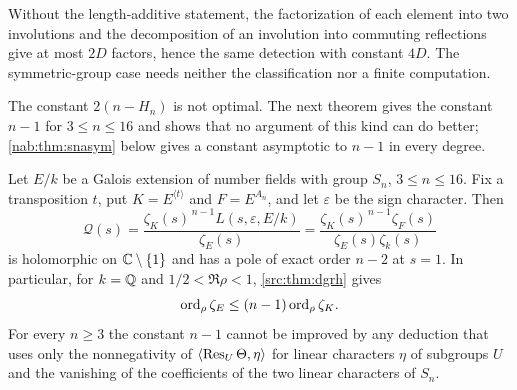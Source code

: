 Without the length-additive statement, the factorization of each element into two
involutions and the decomposition of an involution into commuting reflections give at most
$2D$ factors, hence the same detection with constant $4D$. The symmetric-group case needs
neither the classification nor a finite computation.

The constant $2(n-H_n)$ is not optimal. The next theorem gives the constant $n-1$ for
$3\le n\le16$ and shows that no argument of this kind can do better; \cref{nab:thm:snasym}
below gives a constant asymptotic to $n-1$ in every degree.

\begin{theorem}\label{nab:thm:snsharp}
Let $E/k$ be a Galois extension of number fields with group $S_n$, $3\le n\le16$. Fix a
transposition $t$, put $K=E^{\langle t\rangle}$ and $F=E^{A_n}$, and let $\varepsilon$ be
the sign character. Then
\[
 \mathcal Q(s)=\frac{\zeta_K(s)^{\,n-1}L(s,\varepsilon,E/k)}{\zeta_E(s)}
 =\frac{\zeta_K(s)^{\,n-1}\zeta_F(s)}{\zeta_E(s)\zeta_k(s)}
\]
is holomorphic on $\mathbb{C}\setminus\{1\}$ and has a pole of exact order $n-2$ at $s=1$. In
particular, for $k=\mathbb{Q}$ and $1/2<\Re\rho<1$, \cref{src:thm:dgrh} gives
\[
 \operatorname{ord}_\rho\zeta_E\le(n-1)\operatorname{ord}_\rho\zeta_K .
\]
For every $n\ge3$ the constant $n-1$ cannot be improved by any deduction that uses only
the nonnegativity of $\langle\operatorname{Res}_U\Theta,\eta\rangle$ for linear characters $\eta$ of
subgroups $U$ and the vanishing of the coefficients of the two linear characters of $S_n$.
\end{theorem}
